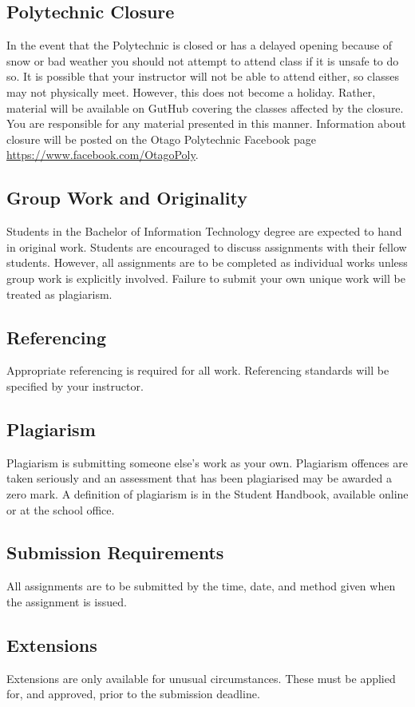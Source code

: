 \documentclass{article}
\begin{document}
\subsection*{Polytechnic Closure}
In the event that the Polytechnic is closed or has a delayed opening because of snow or bad weather you should not attempt to attend class if it is unsafe to do so. It is possible that your instructor will not be able to attend either, so classes may not physically meet. However, this does not become a holiday. Rather, material will be available on GutHub covering the classes affected by the closure. You are responsible for any material presented in this manner. Information about closure will be posted on the Otago Polytechnic Facebook page \url{https://www.facebook.com/OtagoPoly}.

\subsection*{Group Work and Originality}
Students in the Bachelor of Information Technology degree are expected to hand in original work.  Students are encouraged to discuss
assignments with their fellow students.  However, all assignments are to be completed as individual works unless group work is explicitly involved.
Failure to submit your own unique work will be treated as plagiarism.

\subsection*{Referencing}
Appropriate referencing is required for all work.  Referencing standards will be specified by your instructor.

\subsection*{Plagiarism}
Plagiarism is submitting someone else's work as your own.  Plagiarism offences are taken seriously and an
assessment that has been plagiarised may be awarded a zero mark.  A definition of plagiarism is in the Student Handbook,
available online or at the school office.

\subsection*{Submission Requirements}
All assignments are to be submitted by the time, date, and method given when the assignment is issued.

\subsection*{Extensions}
Extensions are only available for unusual circumstances.  These must be applied for, and approved, prior to the submission deadline.
\end{document}
